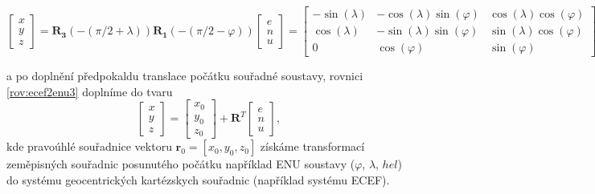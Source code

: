 \documentclass[11pt,a4paper]{article}
\begin{document}
\begin{equation}
\begin{bmatrix}
x \\
y \\
z
\end{bmatrix} =
\mathbf{R_{3}}\left(-\left(\pi/2+\lambda\right)\right)\mathbf{R_{1}}\left(-\left(\pi/2-\varphi\right)\right)
\begin{bmatrix}
e \\
n \\
u
\end{bmatrix} = 
\begin{bmatrix}
-\sin{\left(\lambda\right)} & -\cos{\left(\lambda\right)}\sin{\left(\varphi\right)} & \cos{\left(\lambda\right)}\cos{\left(\varphi\right)} \\
 \cos{\left(\lambda\right)} & -\sin{\left(\lambda\right)}\sin{\left(\varphi\right)} & \sin{\left(\lambda\right)}\cos{\left(\varphi\right)} \\
 0  &  \cos{\left(\varphi\right)} & \sin{\left(\varphi\right)} 
\end{bmatrix}
\begin{bmatrix}
e \\
n \\
u
\end{bmatrix}.
\label{rov:ecef2enu3}
\end{equation}


a po doplnění předpokaldu translace počátku souřadné soustavy, rovnici \ref{rov:ecef2enu3} doplníme do tvaru
\begin{equation}
\begin{bmatrix}
x \\
y \\
z
\end{bmatrix} =
\begin{bmatrix}
x_{0} \\
y_{0} \\
z_{0}
\end{bmatrix} + 
\mathbf{R}^{T}
\begin{bmatrix}
e \\
n \\
u
\end{bmatrix},
\label{rov:ecef2enu33}
\end{equation}
kde pravoúhlé souřadnice vektoru $\mathbf{r}_{0}=\left[x_{0}, y_{0}, z_{0} \right]$ získáme transformací zeměpisných souřadnic posunutého počátku například ENU soustavy ($\varphi$, $\lambda$, $hel$) do systému geocentrických kartézskych souřadnic (například systému ECEF).
\end{document}
